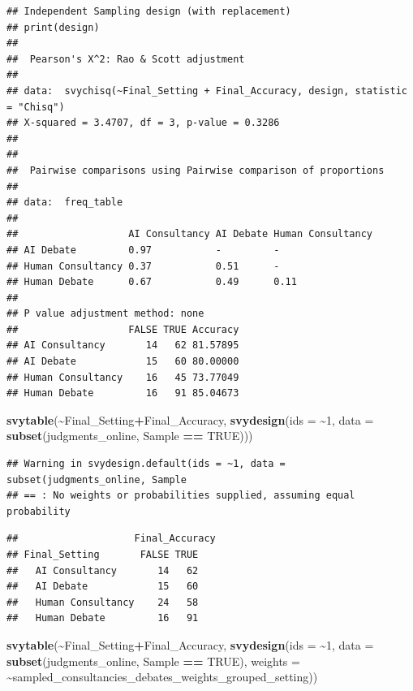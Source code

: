 \documentclass[
]{article}
\newenvironment{Shaded}{\begin{snugshade}}{\end{snugshade}}
\newcommand{\AttributeTok}[1]{\textcolor[rgb]{0.13,0.29,0.53}{#1}}
\newcommand{\ConstantTok}[1]{\textcolor[rgb]{0.56,0.35,0.01}{#1}}
\newcommand{\DecValTok}[1]{\textcolor[rgb]{0.00,0.00,0.81}{#1}}
\newcommand{\FunctionTok}[1]{\textcolor[rgb]{0.13,0.29,0.53}{\textbf{#1}}}
\newcommand{\NormalTok}[1]{#1}
\newcommand{\SpecialCharTok}[1]{\textcolor[rgb]{0.81,0.36,0.00}{\textbf{#1}}}
\newcommand{\StringTok}[1]{\textcolor[rgb]{0.31,0.60,0.02}{#1}}
\begin{document}
\begin{verbatim}
## Independent Sampling design (with replacement)
## print(design)
## 
##  Pearson's X^2: Rao & Scott adjustment
## 
## data:  svychisq(~Final_Setting + Final_Accuracy, design, statistic = "Chisq")
## X-squared = 3.4707, df = 3, p-value = 0.3286
## 
## 
##  Pairwise comparisons using Pairwise comparison of proportions 
## 
## data:  freq_table 
## 
##                   AI Consultancy AI Debate Human Consultancy
## AI Debate         0.97           -         -                
## Human Consultancy 0.37           0.51      -                
## Human Debate      0.67           0.49      0.11             
## 
## P value adjustment method: none 
##                   FALSE TRUE Accuracy
## AI Consultancy       14   62 81.57895
## AI Debate            15   60 80.00000
## Human Consultancy    16   45 73.77049
## Human Debate         16   91 85.04673
\end{verbatim}

\begin{Shaded}
\begin{Highlighting}[]
\FunctionTok{svytable}\NormalTok{(}\SpecialCharTok{\textasciitilde{}}\NormalTok{Final\_Setting}\SpecialCharTok{+}\NormalTok{Final\_Accuracy, }\FunctionTok{svydesign}\NormalTok{(}\AttributeTok{ids =} \SpecialCharTok{\textasciitilde{}}\DecValTok{1}\NormalTok{, }\AttributeTok{data =} \FunctionTok{subset}\NormalTok{(judgments\_online, }\StringTok{\textasciigrave{}}\AttributeTok{Sample}\StringTok{\textasciigrave{}} \SpecialCharTok{==} \ConstantTok{TRUE}\NormalTok{)))}
\end{Highlighting}
\end{Shaded}

\begin{verbatim}
## Warning in svydesign.default(ids = ~1, data = subset(judgments_online, Sample
## == : No weights or probabilities supplied, assuming equal probability
\end{verbatim}

\begin{verbatim}
##                    Final_Accuracy
## Final_Setting       FALSE TRUE
##   AI Consultancy       14   62
##   AI Debate            15   60
##   Human Consultancy    24   58
##   Human Debate         16   91
\end{verbatim}

\begin{Shaded}
\begin{Highlighting}[]
\FunctionTok{svytable}\NormalTok{(}\SpecialCharTok{\textasciitilde{}}\NormalTok{Final\_Setting}\SpecialCharTok{+}\NormalTok{Final\_Accuracy, }\FunctionTok{svydesign}\NormalTok{(}\AttributeTok{ids =} \SpecialCharTok{\textasciitilde{}}\DecValTok{1}\NormalTok{, }\AttributeTok{data =} \FunctionTok{subset}\NormalTok{(judgments\_online, }\StringTok{\textasciigrave{}}\AttributeTok{Sample}\StringTok{\textasciigrave{}} \SpecialCharTok{==} \ConstantTok{TRUE}\NormalTok{), }\AttributeTok{weights =} \SpecialCharTok{\textasciitilde{}}\NormalTok{sampled\_consultancies\_debates\_weights\_grouped\_setting))}
\end{Highlighting}
\end{Shaded}
\end{document}
